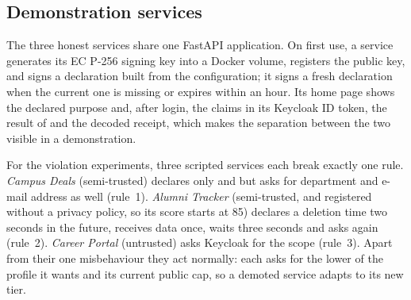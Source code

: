 \subsection{Demonstration services}
The three honest services share one FastAPI application. On first use, a service generates its EC P-256 signing key into a Docker volume, registers the public key, and signs a declaration built from the configuration; it signs a fresh declaration when the current one is missing or expires within an hour. Its home page shows the declared purpose and, after login, the claims in its Keycloak ID token, the result of  and the decoded receipt, which makes the separation between the two visible in a demonstration.

For the violation experiments, three scripted services each break exactly one rule. \emph{Campus Deals} (semi-trusted) declares only  and  but asks for department and e-mail address as well (rule~1). \emph{Alumni Tracker} (semi-trusted, and registered without a privacy policy, so its score starts at 85) declares a deletion time two seconds in the future, receives data once, waits three seconds and asks again (rule~2). \emph{Career Portal} (untrusted) asks Keycloak for the  scope (rule~3). Apart from their one misbehaviour they act normally: each asks for the lower of the profile it wants and its current public cap, so a demoted service adapts to its new tier.


